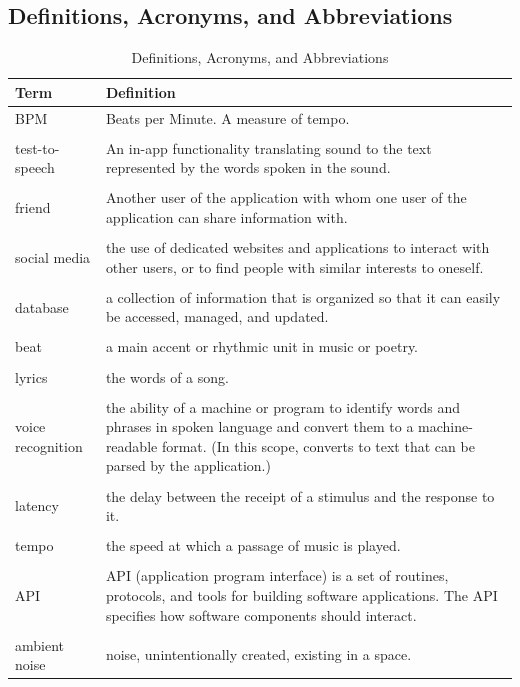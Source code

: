 \documentclass[]{article}
\begin{document}
\subsection{Definitions, Acronyms, and Abbreviations}
\label{sub:definitions_acronyms_and_abbreviations}
\begin{table}[!ht]
\begin{tabularx}{\linewidth}{l|X}
\textbf{Term} & \textbf{Definition} \\
\hline
BPM & Beats per Minute. A measure of tempo.\\\\

test-to-speech & An in-app functionality translating sound to the text represented by the words spoken in the sound.\\\\

friend & Another user of the application with whom one user of the application can share information with.\\\\

social media & the use of dedicated websites and applications to interact with other users, or to find people with similar interests to oneself.\\\\

database & a collection of information that is organized so that it can easily be accessed, managed, and updated.\\\\

beat & a main accent or rhythmic unit in music or poetry.\\\\

lyrics & the words of a song.\\\\

voice recognition & the ability of a machine or program to identify words and phrases in spoken language and convert them to a machine-readable format. (In this scope, converts to text that can be parsed by the application.)\\\\

latency & the delay between the receipt of a stimulus and the response to it.\\\\

tempo & the speed at which a passage of music is played.\\\\

API & API (application program interface) is a set of routines, protocols, and tools for building software applications. The API specifies how software components should interact.\\\\

ambient noise & noise, unintentionally created, existing in a space.
\end{tabularx}
\caption{Definitions, Acronyms, and Abbreviations}
\end{table}
\end{document}
